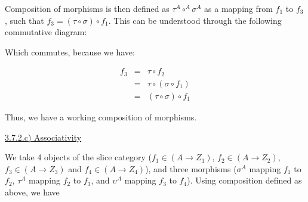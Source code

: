 \documentclass[12pt, letterpaper, twoside]{report}
\begin{document}

Composition of morphisms is then defined as $\tau^A \circ^A \sigma^A$ as a mapping from $f_1$ to $f_3$, such that $f_3 = (\tau \circ \sigma) \circ f_1$. This can be understood through the following commutative diagram:


Which commutes, because we have:

$$
\begin{aligned}
	f_3 &=&  \tau \circ                f_2  \\
		&=&  \tau \circ (\sigma  \circ f_1) \\
		&=& (\tau \circ  \sigma) \circ f_1
\end{aligned}
$$

Thus, we have a working composition of morphisms.

\vspace{5mm}
\underline{3.7.2.c) Associativity}

We take 4 objects of the slice category ($f_1 \in (A \to Z_1)$, $f_2 \in (A \to Z_2)$, $f_3 \in (A \to Z_3)$ and  $f_4 \in (A \to Z_4)$), and three morphisms ($\sigma^A$ mapping $f_1$ to $f_2$, $\tau^A$ mapping $f_2$ to $f_3$, and $\upsilon^A$ mapping $f_3$ to $f_4$). Using composition defined as above, we have
\end{document}

